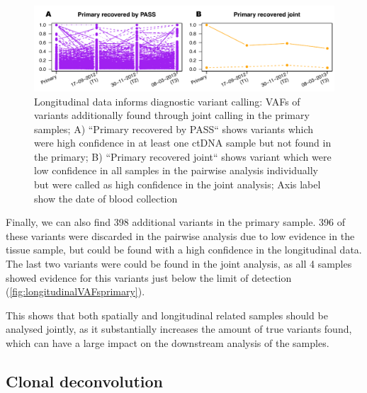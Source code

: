 \begin{figure}[ht]
\centering
\includegraphics[width=.99\linewidth]{Figures/jointVariantCalling/longitudinalCA9primaryVafs.pdf}
\caption[Longitudinal data informs diagnostic variant calling]{Longitudinal data informs diagnostic variant calling: VAFs of variants additionally found through joint calling in the primary samples; A) ``Primary recovered by PASS`` shows variants which were high confidence in at least one ctDNA sample but not found in the primary; B) ``Primary recovered joint`` shows variant which were low confidence in all samples in the pairwise analysis individually but were called as high confidence in the joint analysis; Axis label show the date of blood collection}\label{fig:longitudinalVAFsprimary}
\end{figure}


Finally, we can also find 398 additional variants in the primary sample.  396 of these variants were discarded in the pairwise analysis due to low evidence in the tissue sample, but could be found with a high confidence in the longitudinal data. The last two variants were could be found in the joint analysis, as all 4 samples showed evidence for this variants just below the limit of detection (\autoref{fig:longitudinalVAFsprimary}).

This shows that both spatially and longitudinal related samples should be analysed jointly, as it substantially increases the amount of true variants found, which can have a large impact on the downstream analysis of the samples.



\subsection[Clonal deconvolution]{Clonal deconvolution}
\label{variantcalling-sec:clonal}

